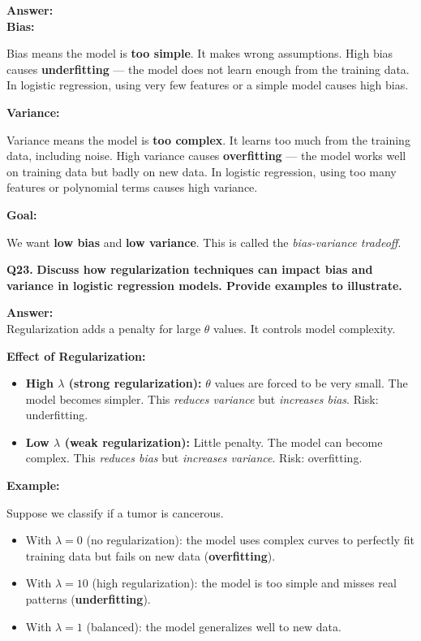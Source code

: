 \documentclass[12pt,a4paper]{article}
\newcommand{\question}[2]{%
    \begin{mdframed}[style=questionstyle]
        \textbf{\textcolor{headerblue}{Q#1.}} \textbf{#2}
    \end{mdframed}%
    \vspace{2pt}%
}
\newcommand{\ans}{\textbf{\textcolor{headerblue}{Answer:}}\\[4pt]}
\newcommand{\subhead}[1]{\textbf{\textcolor{headerblue}{#1}}}
\begin{document}
\ans

\subhead{Bias:}

Bias means the model is \textbf{too simple}. It makes wrong assumptions. High bias causes \textbf{underfitting} --- the model does not learn enough from the training data. In logistic regression, using very few features or a simple model causes high bias.

\subhead{Variance:}

Variance means the model is \textbf{too complex}. It learns too much from the training data, including noise. High variance causes \textbf{overfitting} --- the model works well on training data but badly on new data. In logistic regression, using too many features or polynomial terms causes high variance.

\subhead{Goal:}

We want \textbf{low bias} and \textbf{low variance}. This is called the \textit{bias-variance tradeoff}.

\vspace{10pt}
\question{23}{Discuss how regularization techniques can impact bias and variance in logistic regression models. Provide examples to illustrate.}

\ans

Regularization adds a penalty for large $\theta$ values. It controls model complexity.

\subhead{Effect of Regularization:}
\begin{itemize}[leftmargin=*]
    \item \textbf{High $\lambda$ (strong regularization):} $\theta$ values are forced to be very small. The model becomes simpler. This \textit{reduces variance} but \textit{increases bias}. Risk: underfitting.
    \item \textbf{Low $\lambda$ (weak regularization):} Little penalty. The model can become complex. This \textit{reduces bias} but \textit{increases variance}. Risk: overfitting.
\end{itemize}

\subhead{Example:}

Suppose we classify if a tumor is cancerous.
\begin{itemize}[leftmargin=*]
    \item With $\lambda = 0$ (no regularization): the model uses complex curves to perfectly fit training data but fails on new data (\textbf{overfitting}).
    \item With $\lambda = 10$ (high regularization): the model is too simple and misses real patterns (\textbf{underfitting}).
    \item With $\lambda = 1$ (balanced): the model generalizes well to new data. \checkmark
\end{itemize}
\end{document}
